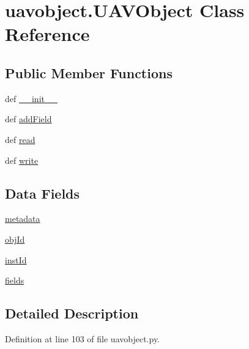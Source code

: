 \hypertarget{classuavobject_1_1_u_a_v_object}{\section{uavobject.\-U\-A\-V\-Object Class Reference}
\label{classuavobject_1_1_u_a_v_object}
}
\subsection*{Public Member Functions}
\begin{DoxyCompactItemize}
\item 
def \hyperlink{classuavobject_1_1_u_a_v_object_a6744d21db1b6b3009810ccc3699de1e9}{\-\_\-\-\_\-init\-\_\-\-\_\-}
\item 
def \hyperlink{classuavobject_1_1_u_a_v_object_a25042c8f435aa4ea70a6172834795dc1}{add\-Field}
\item 
def \hyperlink{classuavobject_1_1_u_a_v_object_a2c184fbd9d725d8ffeb6c7f3ea4ebf64}{read}
\item 
def \hyperlink{classuavobject_1_1_u_a_v_object_a11ee3cbbc5b35d2caf571e7d1e4391ac}{write}
\end{DoxyCompactItemize}
\subsection*{Data Fields}
\begin{DoxyCompactItemize}
\item 
\hyperlink{classuavobject_1_1_u_a_v_object_a00f0fd345df36ab7ff5e70d12ed90ce8}{metadata}
\item 
\hyperlink{classuavobject_1_1_u_a_v_object_aff7e18dd61e0464e32b141d3b123209c}{obj\-Id}
\item 
\hyperlink{classuavobject_1_1_u_a_v_object_afb8864f141f2aca9fefa152fd64aeebe}{inst\-Id}
\item 
\hyperlink{classuavobject_1_1_u_a_v_object_af9ce81de37f806ae8b2b50bfa9e6c72b}{fields}
\end{DoxyCompactItemize}


\subsection{Detailed Description}


Definition at line 103 of file uavobject.\-py.



